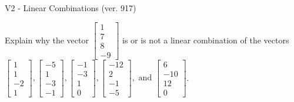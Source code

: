 \begin{exercise}
  \begin{exerciseTitle}V2 - Linear Combinations (ver. 917)\end{exerciseTitle}
  \begin{exerciseStatement}
    Explain why the vector \(\left[\begin{array}{c}
1 \\
7 \\
8 \\
-9
\end{array}\right]\)  is or is not a linear 
	combination of the vectors \(\left[\begin{array}{c}
1 \\
1 \\
-2 \\
1
\end{array}\right] , \left[\begin{array}{c}
-5 \\
1 \\
-3 \\
-1
\end{array}\right] , \left[\begin{array}{c}
-1 \\
-3 \\
1 \\
0
\end{array}\right] , \left[\begin{array}{c}
-12 \\
2 \\
-1 \\
-5
\end{array}\right] , \text{ and } \left[\begin{array}{c}
6 \\
-10 \\
12 \\
0
\end{array}\right]\).
	



\end{exerciseStatement}
\end{exercise}
